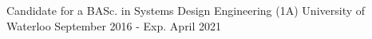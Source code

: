 \begin{cventries}
\vspace*{-5mm}
  \cventry
    {Candidate for a BASc. in Systems Design Engineering (1A)}
    {University of Waterloo}
    {September 2016 - Exp. April 2021}
    {}
    {}
\end{cventries}
